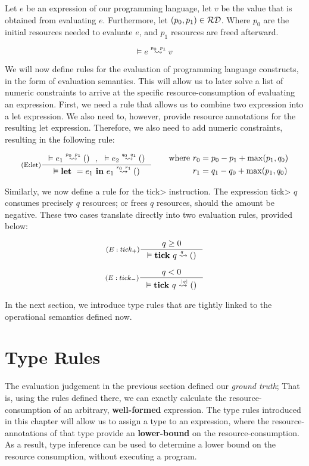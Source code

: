 \begin{definition}\label{def:evaluation-judgement}
   Let \(e\) be an expression of our programming language, let \(v\) be the value that is obtained from evaluating \(e\). Furthermore, let \((p_0, p_1) \in \mathcal{RD}\). 
   Where \(p_0\) are the initial resources needed to evaluate \(e\), and \(p_1\) resources are freed afterward.
   
   \[
      \evals{}{e}{v}{p_0}{p_1}
   \]
\end{definition}

We will now define rules for the evaluation of programming language constructs, in the form of evaluation semantics. This will allow us to later solve a list of numeric constraints to arrive at the specific resource-consumption of evaluating an expression.
First, we need a rule that allows us to combine two expression into a let expression. We also need to, however, provide resource annotations for the resulting let expression. Therefore, we also need to add numeric constraints, resulting in the following rule:

\[
   \inference[(E:let)]
   {\evals{}{e_1}{()}{p_0}{p_1} ~~,~~ \evals{}{e_2}{()}{q_0}{q_1}}
   {\evals{}{\letexp{}{e_1}{e_1}}{()}{r_0}{r_1}}
   \qquad
   \begin{aligned}
      \text{where }  &r_0 = p_0 - p_1 + \max(p_1, q_0)\\
                     &r_1 = q_1 - q_0 + \max(p_1, q_0) 
   \end{aligned}
\]

Similarly, we now define a rule for the \<tick> instruction. The expression \<tick> \(q\) consumes precisely \(q\) resources; or frees \(q\) resources, should the amount be negative. These two cases translate directly into two evaluation rules, provided below:

\[
   \inference[\((E:tick_{+})\)]
   {q \geq 0}
   {\evals{}{\tick{q}}{()}{q}{}}
\]

\[
   \inference[\((E:tick_{-})\)]
   {q < 0}
   {\evals{}{\tick{q}}{()}{}{|q|}}
\]

In the next section, we introduce type rules that are tightly linked to the operational semantics defined now. 

\section{Type Rules}
The evaluation judgement in the previous section defined our \emph{ground truth}; That is, using the rules defined there, we can exactly calculate the resource-consumption of an arbitrary, \textbf{well-formed} expression. The type rules introduced in this chapter will allow us to assign a type to an expression, where the resource-annotations of that type provide an \textbf{lower-bound} on the resource-consumption. As a result, type inference can be used to determine a lower bound on the resource consumption, without executing a program.

